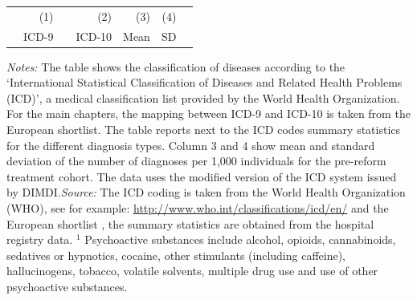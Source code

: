 \documentclass[11pt, a4paper, draft]{article} %
\begin{document}
\begin{landscape}
\begin{table}[h]
\begin{threeparttable}
			\begin{tabular}{lrrrrrr} %
				\toprule %
				&\multicolumn{1}{r}{(1)}& &\multicolumn{1}{r}{(2)}&\multicolumn{1}{r}{(3)} &\multicolumn{1}{r}{(4)}\\
				&\multicolumn{1}{r}{ICD-9} & & \multicolumn{1}{r}{ICD-10}&\multicolumn{1}{r}{Mean}&\multicolumn{1}{r}{SD} \\ 
				\midrule
				
				\bottomrule %
			\end{tabular}
			\begin{tablenotes}
				\scriptsize{ \item \textit{Notes:} The table shows the classification of diseases according to the `International Statistical Classification of Diseases and Related Health Problems (ICD)', a medical classification list provided by the World Health Organization. For the main chapters, the mapping between ICD-9 and ICD-10 is taken from the European shortlist. The table reports next to the ICD codes summary statistics for the different diagnosis types. Column 3 and 4 show mean and standard deviation of the number of diagnoses per 1,000 individuals for the pre-reform treatment cohort. The data uses the modified version of the ICD system issued by DIMDI.\newline \textit{Source:} The ICD coding is taken from the World Health Organization (WHO), see for example: \href{http://www.who.int/classifications/icd/en/}{http://www.who.int/classifications/icd/en/} and the European shortlist \citep[p. 76]{statistisches2012diagnosedaten}, the summary statistics are obtained from the hospital registry data. \newline\hspace*{15 pt}$^1$ Psychoactive substances include alcohol, opioids, cannabinoids, sedatives or hypnotics, cocaine, other stimulants (including caffeine), hallucinogens, tobacco, volatile solvents, multiple drug use and use of other psychoactive substances. }
			\end{tablenotes}
		\end{threeparttable}
	\end{table}
	\vspace*{\fill}\clearpage 
\end{landscape}
\end{document}
